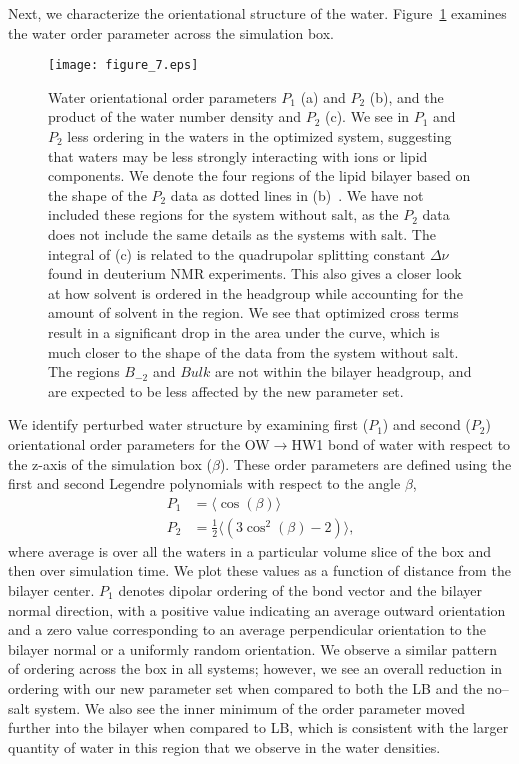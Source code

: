 Next, we characterize the orientational structure of the water.
Figure~\ref{figch2:waterorder} examines the water order parameter across the simulation box. 
\begin{figure}[h!tb]
    \caption[Water orientational order parameters]{ Water orientational order parameters $P_1$ (a) and $P_2$ (b), 
and the product of the water number density and $P_2$ (c). We see in $P_1$ and $P_2$ less
    ordering in the waters in the optimized system, suggesting that waters may be less strongly interacting with ions or lipid components. We denote the four regions of the lipid bilayer based on the shape of the $P_2$ data as dotted lines
    in (b)~\cite{saunders:2019}. We have not included these regions
 for the system without salt, as the $P_2$ data does not include the same details as the systems with salt. The integral of (c) is related to the
 quadrupolar splitting constant $\Delta \nu$ found in deuterium NMR experiments. This also gives a closer look at how solvent is ordered in the headgroup while
 accounting for the amount of solvent in the region. We see that optimized cross terms result in a significant drop in the area under the curve, which is much closer
 to the shape of the data from the system without salt. 
 The regions $B_{-2}$ and $Bulk$ are not within the bilayer
headgroup, and are expected to be less affected by the new parameter set.}
    \label{figch2:waterorder}
    \texttt{[image: figure\_7.eps]}
\end{figure}
We identify perturbed water structure by examining first ($P_1$) and second ($P_2$) 
orientational order parameters for the
OW$\rightarrow$HW1 bond of water with respect to the z-axis of the simulation box ($\beta$). 
These order parameters are defined using the first and second 
Legendre polynomials with respect to the angle $\beta$,
\begin{equation}
    \begin{split}
    P_1&=\langle \cos\left(\beta\right) \rangle
    \\ P_2&=\frac{1}{2}\bigg\langle\left(3\cos^2\left(\beta\right)-2\right)\bigg\rangle
    \text{,} 
\end{split}
\end{equation}
where average is over all the waters in a particular volume slice of the box 
and then over simulation time.  
We plot these values as a function of distance from the bilayer center. 
$P_1$ denotes dipolar ordering of the bond vector and the bilayer normal direction, 
with a positive value indicating an average outward orientation 
and a zero value corresponding to an average perpendicular orientation to the
bilayer normal or a uniformly random orientation. 
We observe a similar pattern of ordering across the box in all systems; 
however, we see an overall reduction in ordering with our new parameter set when
compared to both the LB and the no--salt system. 
We also see the inner minimum of the order parameter moved further into the bilayer
when compared to LB, 
which is consistent with the larger quantity of water 
in this region that we observe in the water densities.

